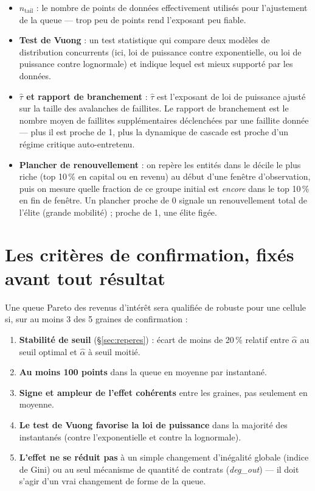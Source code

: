 \documentclass[11pt,a4paper]{article}
\begin{document}
\begin{itemize}
  $\hat\alpha$ ne bouge pas de plus de 20\,\% --- sinon, la « queue
  Pareto » n'est qu'un artefact du choix de seuil, pas un vrai trait des
  données.
\item \textbf{$n_{\mathrm{tail}}$} : le nombre de points de données
  effectivement utilisés pour l'ajustement de la queue --- trop peu de
  points rend l'exposant peu fiable.
\item \textbf{Test de Vuong} : un test statistique qui compare deux
  modèles de distribution concurrents (ici, loi de puissance contre
  exponentielle, ou loi de puissance contre lognormale) et indique
  lequel est mieux supporté par les données.
\item \textbf{$\hat\tau$ et rapport de branchement} : $\hat\tau$ est
  l'exposant de loi de puissance ajusté sur la taille des avalanches de
  faillites. Le rapport de branchement est le nombre moyen de faillites
  supplémentaires déclenchées par une faillite donnée --- plus il est
  proche de 1, plus la dynamique de cascade est proche d'un régime
  critique auto-entretenu.
\item \textbf{Plancher de renouvellement} : on repère les entités dans
  le décile le plus riche (top 10\,\% en capital ou en revenu) au début
  d'une fenêtre d'observation, puis on mesure quelle fraction de ce
  groupe initial est \emph{encore} dans le top 10\,\% en fin de
  fenêtre. Un plancher proche de 0 signale un renouvellement total de
  l'élite (grande mobilité) ; proche de 1, une élite figée.
\end{itemize}

\section{Les critères de confirmation, fixés avant tout résultat}
\label{sec:criteres}

Une queue Pareto des revenus d'intérêt sera qualifiée de robuste pour
une cellule si, sur au moins 3 des 5 graines de confirmation :

\begin{enumerate}
\item \textbf{Stabilité de seuil} (\S\ref{sec:reperes}) : écart de
  moins de 20\,\% relatif entre $\hat\alpha$ au seuil optimal et
  $\hat\alpha$ à seuil moitié.
\item \textbf{Au moins 100 points} dans la queue en moyenne par
  instantané.
\item \textbf{Signe et ampleur de l'effet cohérents} entre les graines,
  pas seulement en moyenne.
\item \textbf{Le test de Vuong favorise la loi de puissance} dans la
  majorité des instantanés (contre l'exponentielle et contre la
  lognormale).
\item \textbf{L'effet ne se réduit pas} à un simple changement
  d'inégalité globale (indice de Gini) ou au seul mécanisme de quantité
  de contrats (\emph{deg\_out}) --- il doit s'agir d'un vrai changement
  de forme de la queue.
\end{enumerate}
\end{document}
